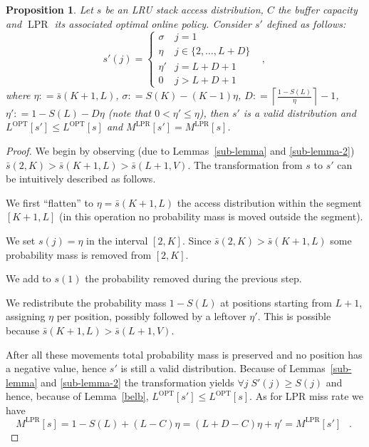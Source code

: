 \documentclass[11pt,a4paper]{article}
\DeclareMathOperator{\opt}{OPT}
\DeclareMathOperator{\lpr}{LPR}
\DeclareMathOperator{\mf}{\enspace .}
\DeclareMathOperator{\mc}{\enspace ,}
\newcommand{\deq}{\mathrel{\mathop:}=}
\newtheorem{proposition}{Proposition}
\theoremstyle{definition}
\theoremstyle{remark}
\begin{document}
\begin{proposition}\label{sigmaeta}
  Let $s$ be an LRU stack access distribution, $C$ the buffer capacity and $\lpr$
  its associated optimal online policy. Consider $s'$ defined as follows:
  \begin{equation}
    s'(j)=
    \begin{cases}
      \sigma & j=1\\
      \eta & j\in \{2,\ldots,L+D\}\\
      \eta' & j=L+D+1\\
      0 & j>L+D+1
    \end{cases}\mc
  \end{equation}
  where $\eta \deq \bar s(K+1,L)$, $\sigma \deq S(K) - (K-1)\eta$, $D \deq
  \left\lceil \frac{1-S(L)}{\eta} \right\rceil - 1$, $\eta' \deq 1-S(L)-D\eta$
  (note that $0<\eta'\leq \eta$), then $s'$ is a valid distribution and
  $L^{\opt}[s'] \leq L^{\opt}[s]$ and $M^{\lpr}[s'] = M^{\lpr}[s]$.
\end{proposition}
\begin{proof}  We begin by observing (due to Lemmas~\ref{sub-lemma} and \ref{sub-lemma-2})
  $\bar s(2, K)>\bar s(K+1, L)>\bar s(L+1, V)$.  The transformation from $s$ to
  $s'$ can be intuitively described as follows.
  \begin{compactitem}
  \item We first ``flatten'' to $\eta=\bar s(K+1, L)$ the access distribution
    within the segment $[K+1, L]$ (in this operation no probability mass is
    moved outside the segment).
  \item We set $s(j)=\eta$ in the interval $[2,K]$. Since $\bar s(2, K)>\bar
    s(K+1, L)$ some probability mass is removed from $[2, K]$.
  \item We add to $s(1)$ the probability removed during the previous step.
  \item We redistribute the probability mass $1-S(L)$ at positions starting from
    $L+1$, assigning $\eta$ per position, possibly followed by a leftover
    $\eta'$. This is possible because $\bar s(K+1, L)>\bar s(L+1, V)$.
  \end{compactitem}
  After all these movements total probability mass is preserved and no position
  has a negative value, hence $s'$ is still a valid distribution. Because of
  Lemmas~\ref{sub-lemma} and \ref{sub-lemma-2} the transformation yields
  $\forall j \; S'(j) \geq S(j)$ and hence, because of Lemma~\ref{belb},
  $L^{\opt}[s'] \leq L^{\opt}[s]$. As for LPR miss rate we have
  \begin{equation}
    M^{\lpr}[s] = 1-S(L) + (L-C)\eta = (L+D-C)\eta + \eta' = M^{\lpr}[s'] \mf    
  \end{equation}
\end{proof}
\end{document}
